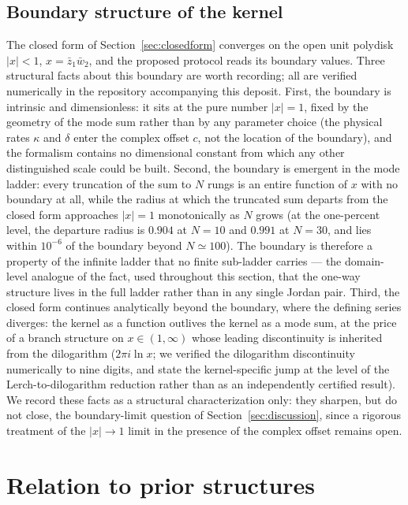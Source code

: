\documentclass[11pt,a4paper]{article}
\newcommand{\zbone}{\bar{z}_1}
\newcommand{\wbtwo}{\bar{w}_2}
\begin{document}
\subsection{Boundary structure of the kernel}
\label{sec:boundary}

The closed form of Section~\ref{sec:closedform} converges on the open unit
polydisk $|x| < 1$, $x = \zbone\wbtwo$, and the proposed protocol reads its
boundary values. Three structural facts about this boundary are worth
recording; all are verified numerically in the repository accompanying this
deposit. First, the boundary is intrinsic and dimensionless: it sits at the
pure number $|x| = 1$, fixed by the geometry of the mode sum rather than by
any parameter choice (the physical rates $\kappa$ and $\delta$ enter the
complex offset $c$, not the location of the boundary), and the formalism
contains no dimensional constant from which any other distinguished scale
could be built. Second, the boundary is emergent in the mode ladder: every
truncation of the sum to $N$ rungs is an entire function of $x$ with no
boundary at all, while the radius at which the truncated sum departs from
the closed form approaches $|x| = 1$ monotonically as $N$ grows (at the
one-percent level, the departure radius is $0.904$ at $N = 10$ and $0.991$
at $N = 30$, and lies within $10^{-6}$ of the boundary beyond
$N \simeq 100$). The boundary is therefore a property of the infinite
ladder that no finite sub-ladder carries --- the domain-level analogue of
the fact, used throughout this section, that the one-way structure lives in
the full ladder rather than in any single Jordan pair. Third, the closed
form continues analytically beyond the boundary, where the defining series
diverges: the kernel as a function outlives the kernel as a mode sum, at
the price of a branch structure on $x \in (1, \infty)$ whose leading
discontinuity is inherited from the dilogarithm ($2\pi i \ln x$; we
verified the dilogarithm discontinuity numerically to nine digits, and
state the kernel-specific jump at the level of the Lerch-to-dilogarithm
reduction rather than as an independently certified result). We record
these facts as a structural characterization only: they sharpen, but do
not close, the boundary-limit question of Section~\ref{sec:discussion},
since a rigorous treatment of the $|x| \to 1$ limit in the presence of the
complex offset remains open.

\section{Relation to prior structures}
\label{sec:prior}
\end{document}
